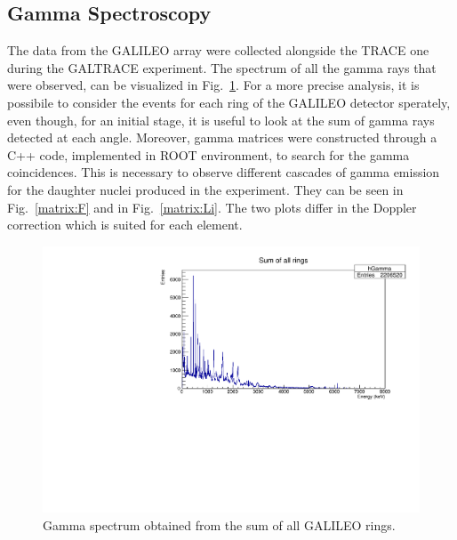 \subsection{Gamma Spectroscopy}\label{gammaspectr}

The data from the GALILEO array were collected alongside the TRACE one during the
GALTRACE experiment. The spectrum of all the gamma rays that were observed,
can be visualized in Fig.~\ref{gamma}.
For a more precise analysis, it is possibile to consider the events for each
ring of the GALILEO detector sperately, even though, for an initial stage,
it is useful to look at the sum of gamma rays detected at each angle.
Moreover, gamma matrices were constructed through a C++ code,
implemented in ROOT environment, to search for the gamma coincidences.
This is necessary to observe different cascades of gamma emission for the
daughter nuclei produced in the experiment.
They can be seen in Fig.~\ref{matrix:F} and in Fig.~\ref{matrix:Li}.
The two plots differ in the Doppler correction which is suited for each element.

\begin{figure}[h]
  \centering
  \includegraphics[scale=.6]{img/gamma.pdf}
  \caption{Gamma spectrum obtained from the sum of all GALILEO rings.}
  \label{gamma}
\end{figure}


